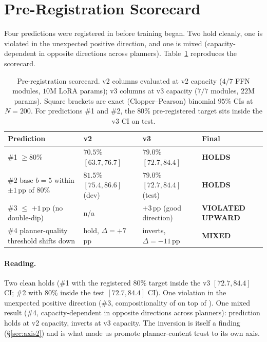 \section{Pre-Registration Scorecard}
\label{app:prereg}

Four predictions were registered in  before
training began.  Two hold cleanly, one is violated in the
unexpected positive direction, and one is mixed (capacity-dependent
in opposite directions across planners).
Table~\ref{tab:prereg} reproduces the scorecard.

\begin{table}[h]
\centering
\caption{Pre-registration scorecard.  v2 columns evaluated at
v2 capacity ($4/7$ FFN modules, $10$M LoRA params); v3 columns at
v3 capacity ($7/7$ modules, $22$M params).  Square brackets are
exact (Clopper--Pearson) binomial $95\%$ CIs at $N{=}200$.  For
predictions \#1 and \#2, the $80\%$ pre-registered target sits
inside the v3 CI on test.}
\label{tab:prereg}
\smallskip
\small
\begin{tabular}{p{}lll}
\toprule
Prediction & v2 & v3 & Final \\
\midrule
\#1 \ctwoc{} $\geq 80\%$ &
  $70.5\%$ \mbox{$[63.7, 76.7]$} &
  $79.0\%$ \mbox{$[72.7, 84.4]$} &
  \textbf{HOLDS} \\
\#2 base \cmaj{} $b{=}5$ within $\pm 1$\,pp of $80\%$ &
  $81.5\%$ \mbox{$[75.4, 86.6]$} (dev) &
  $79.0\%$ \mbox{$[72.7, 84.4]$} (test) &
  \textbf{HOLDS} \\
\#3 \cmajc{} $\leq$ \cmaj{} $+ 1$\,pp (no double-dip) &
  n/a &
  $+3$\,pp (good direction) &
  \textbf{VIOLATED UPWARD} \\
\#4 planner-quality threshold shifts down &
  hold, $\Delta{=}+7$\,pp &
  inverts, $\Delta{=}-11$\,pp &
  \textbf{MIXED} \\
\bottomrule
\end{tabular}
\normalsize
\end{table}

\paragraph{Reading.}
Two clean holds (\#1 with the registered $80\%$ target inside the
v3 \mbox{$[72.7, 84.4]$} CI; \#2 with $80\%$ inside the test
\mbox{$[72.7, 84.4]$} CI).  One violation in the unexpected
positive direction (\#3, compositionality of \cmajc{} on top of
\ctwoc{}).  One mixed result (\#4, capacity-dependent in opposite directions
across planners): prediction holds at v2 capacity, inverts at v3
capacity.  The
inversion is itself a finding (\S\ref{sec:axis2}) and is what
made us promote planner-content trust to its own axis.

